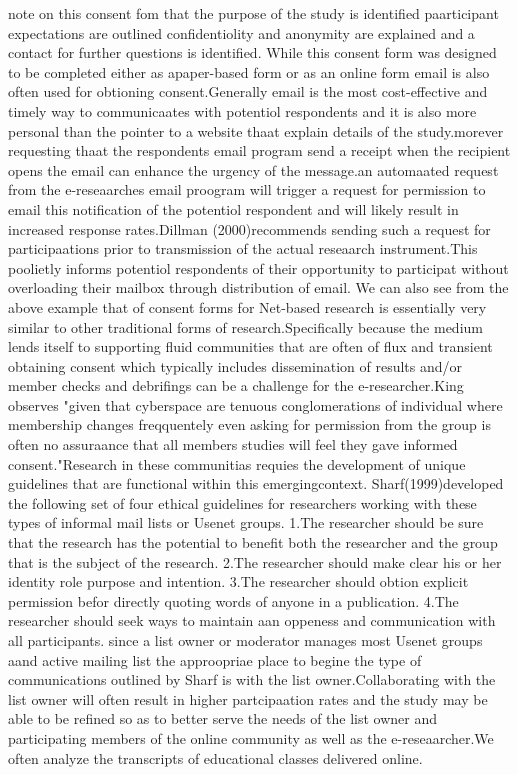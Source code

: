 \documentclass[a4paper]{book}
\begin{document}
note on this consent fom that the purpose of the study is identified paarticipant expectations are outlined confidentiolity and anonymity are explained and a contact for further questions is identified. While this consent form was designed to be completed either as apaper-based form or as an online form email is also often used for obtioning consent.Generally email is the most cost-effective and timely way to communicaates with potentiol respondents and it is also more personal than the pointer to a website thaat explain details of the study.morever requesting thaat the respondents email program send a receipt when the recipient opens the email can enhance the urgency of the message.an automaated request from the e-reseaarches email proogram will trigger a request for permission to email this notification of the potentiol respondent and will likely result in increased response rates.Dillman (2000)recommends sending such a request for participaations prior to transmission of the actual reseaarch instrument.This poolietly informs potentiol respondents of their opportunity to participat without overloading their mailbox through distribution of email.
We can also see from the above example that of consent forms for Net-based research is essentially very similar to other traditional forms of research.Specifically because the medium lends itself to supporting fluid communities that are often of flux and transient obtaining consent which typically includes dissemination of results and/or member checks and debrifings can be a challenge for the e-researcher.King observes "given that cyberspace are tenuous conglomerations of individual where  
membership changes freqquentely even asking for permission from the group is often no assuraance that all members studies will feel they gave informed consent."Research in these communitias requies the development of unique guidelines that are functional within this emergingcontext.
\newpage
Sharf(1999)developed the following set of four ethical guidelines for researchers working with these types of informal mail lists or Usenet groups.
1.The researcher should be sure that the research has the potential to benefit both the researcher and the group that is the subject of the research.
2.The researcher should make clear his or her identity role purpose and intention.
3.The researcher should obtion explicit permission befor directly quoting words of anyone in a publication.
4.The researcher should seek ways to maintain aan oppeness and communication with all participants.
since a list owner or moderator manages most Usenet groups aand active mailing list the approopriae place to begine the type of communications outlined by Sharf is with the list owner.Collaborating with the list owner will often result in higher partcipaation rates and the study may be able to be refined so as to better serve the needs of the list owner and participating members of the online community as well as the e-reseaarcher.We often analyze the transcripts of educational classes delivered online.
\end{document}
